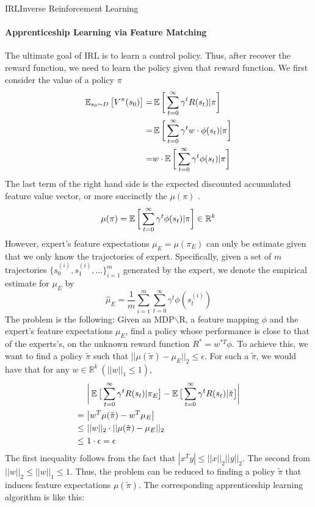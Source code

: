 \documentclass[9pt]{article}
\begin{document}
\begin{topic}{IRL}{Inverse Reinforcement Learning}
\paragraph{Apprenticeship Learning via Feature Matching} The ultimate goal of IRL is to learn a control policy. Thus, after recover the reward function, we need to learn the policy given that reward function. We first consider the value of a policy $\pi$
\[
\begin{split}
\operatorname{\mathbb{E}}_{s_0 \sim D}\big[V^{\pi}(s_0)\big] = & \operatorname{\mathbb{E}}\bigg[\sum_{t=0}^{\infty} \gamma^t R(s_t)|\pi \bigg]\\
= & \operatorname{\mathbb{E}}\bigg[\sum_{t=0}^{\infty} \gamma^t w \cdot \phi(s_t)|\pi \bigg]\\
= & w \cdot \operatorname{\mathbb{E}}\bigg[\sum_{t=0}^{\infty} \gamma^t \phi(s_t)|\pi \bigg]
\end{split}
\]
The last term of the right hand side is the expected discounted accumulated feature value vector, or more succinctly the  $\mu(\pi)$ \citep{Abbeel2004Apprenticeship}.
\[
\mu(\pi) = \operatorname{\mathbb{E}}\bigg[\sum_{t=0}^{\infty} \gamma^t \phi(s_t)|\pi \bigg] \in \mathbb{R}^k
\]
However, expert's feature expectations $\mu_E = \mu(\pi_E)$ can only be estimate given that we only know the trajectories of expert. Specifically, given a set of $m$ trajectories $\{s_0^{(i)},s_1^{(i)},\ldots\}_{i=1}^m$ generated by the expert, we denote the empirical estimate for $\mu_E$ by
 \[
 \hat{\mu}_E = \frac{1}{m} \sum_{i=1}^m \sum_{t=0}^{\infty} \gamma^t \phi(s_t^{(i)})
 \]
 The problem is the following: Given an MDP$\backslash$R, a feature mapping $\phi$ and the expert's feature expectations $\mu_E$, find a policy whose performance is close to that of the experts's, on the unknown reward function $R^* = w^{*T}\phi$. To achieve this, we want to find a policy $\tilde{\pi}$ such that $||\mu(\tilde{\pi})-\mu_E||_2 \le \epsilon$. For such a $\tilde{\pi}$, we would have that for any $w \in \mathbb{R}^k \ (||w||_1\le1)$,
 \[
 \begin{split}
 &\ \bigg|\operatorname{\mathbb{E}}\big[\sum_{t=0}^{\infty}\gamma^t R(s_t)|\pi_E\big] - \operatorname{\mathbb{E}}\big[\sum_{t=0}^{\infty}\gamma^t R(s_t)|\tilde{\pi}\big]\bigg|\\
 = &\ \big|w^T\mu(\tilde{\pi})-w^T\mu_E\big|\\
 \le &\ ||w||_2\cdot||\mu(\tilde{\pi})-\mu_E||_2\\
 \le &\ 1\cdot \epsilon  = \epsilon
 \end{split}
 \]
 The first inequality follows from the fact that $|x^Ty| \le ||x||_2||y||_2$. The second from $||w||_2 \le ||w||_1 \le 1$. Thus, the problem can be reduced to finding a policy $\tilde{\pi}$ that induces feature expectations $\mu(\tilde{\pi})$. The corresponding apprenticeship learning algorithm is like this:

\end{topic}
\end{document}
